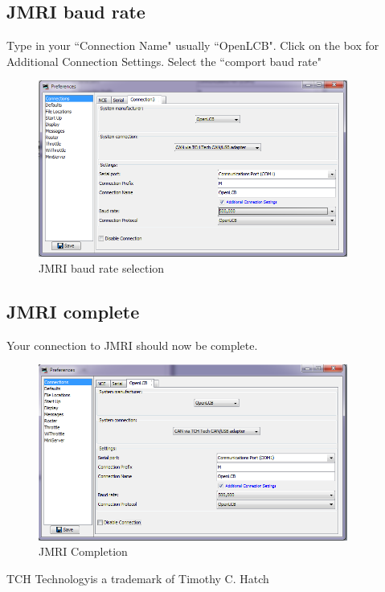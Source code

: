 \documentclass[11pt]{book}
\begin{document}
\subsection{JMRI baud rate }
Type in your ``Connection Name"  usually ``OpenLCB".  Click on the box for Additional Connection Settings. Select the ``comport baud rate"
\begin{figure}[htbp]
\begin{center}
\includegraphics[width=4in]{images/baud_rate.png}
\caption{JMRI baud rate selection}
\end{center}
\end{figure}

\subsection{JMRI complete }
Your connection to JMRI should now be complete.
\begin{figure}[htbp]
\begin{center}
\includegraphics[width=4in]{images/jmri_complete.png}
\caption{JMRI Completion}
\end{center}
\end{figure}

\printindex

\newpage


 TCH Technology\texttrademark is a trademark of Timothy C. Hatch
\end{document}
